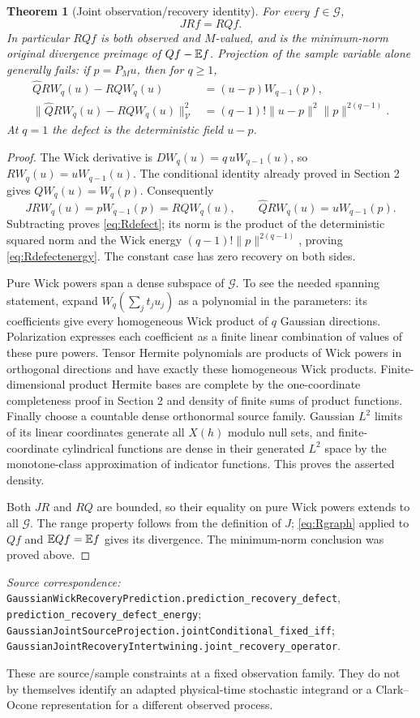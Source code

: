 \documentclass[11pt]{article}
\newtheorem{theorem}{Theorem}[section]
\newcommand{\code}[1]{{\small\nolinkurl{#1}}}
\begin{document}
\begin{theorem}[Joint observation/recovery identity]\label{thm:jointR}
For every $f\in\mathcal G$,
\[
 JRf=RQf.
\]
In particular $RQf$ is both observed and $M$-valued, and is the
minimum-norm original divergence preimage of $Qf-\mathbb E f$. Projection
of the sample variable alone generally fails: if $p=P_Mu$, then
for $q\geq1$,
\begin{align}
 \widehat Q R W_q(u)-RQW_q(u)&=(u-p)W_{q-1}(p),\label{eq:Rdefect}\\
 \|\widehat Q R W_q(u)-RQW_q(u)\|_{\mathcal V}^2
  &=(q-1)!\|u-p\|^2\|p\|^{2(q-1)}.\label{eq:Rdefectenergy}
\end{align}
At $q=1$ the defect is the deterministic field $u-p$.
\end{theorem}
\begin{proof}
The Wick derivative is $DW_q(u)=q\,uW_{q-1}(u)$, so
$RW_q(u)=uW_{q-1}(u)$. The conditional identity already proved in
Section 2 gives $QW_q(u)=W_q(p)$. Consequently
\[
 JRW_q(u)=pW_{q-1}(p)=RQW_q(u),\qquad
 \widehat Q RW_q(u)=uW_{q-1}(p).
\]
Subtracting proves \eqref{eq:Rdefect}; its norm is the product of
the deterministic squared norm and the Wick energy
$(q-1)!\|p\|^{2(q-1)}$, proving \eqref{eq:Rdefectenergy}.
The constant case has zero recovery on both sides.

Pure Wick powers span a dense subspace of $\mathcal G$. To see the
needed spanning statement, expand
$W_q(\sum_j t_ju_j)$ as a polynomial in the parameters: its coefficients
give every homogeneous Wick product of $q$ Gaussian directions.
Polarization expresses each coefficient as a finite linear combination
of values of these pure powers. Tensor Hermite polynomials are products
of Wick powers in orthogonal directions and have exactly these
homogeneous Wick products. Finite-dimensional product Hermite bases
are complete by the one-coordinate completeness proof in Section 2
and density of finite sums of product functions. Finally choose a
countable dense orthonormal source family. Gaussian $L^2$ limits of
its linear coordinates generate all $X(h)$ modulo null sets, and
finite-coordinate cylindrical functions are dense in their generated
$L^2$ space by the monotone-class approximation of indicator functions.
This proves the asserted density.

Both $JR$ and $RQ$ are bounded, so their equality on pure Wick powers
extends to all $\mathcal G$. The range property follows from the
definition of $J$; \eqref{eq:Rgraph} applied to $Qf$ and $\mathbb E Qf=\mathbb E f$
gives its divergence. The minimum-norm conclusion was proved above.
\end{proof}
\par\smallskip\begingroup\small\raggedright
\textit{Source correspondence:} \code{GaussianWickRecoveryPrediction.prediction_recovery_defect},
\code{prediction_recovery_defect_energy};
\code{GaussianJointSourceProjection.jointConditional_fixed_iff};
\code{GaussianJointRecoveryIntertwining.joint_recovery_operator}.
\par\endgroup
These are source/sample constraints at a fixed observation family.
They do not by themselves identify an adapted physical-time stochastic
integrand or a Clark--Ocone representation for a different observed process.
\end{document}
